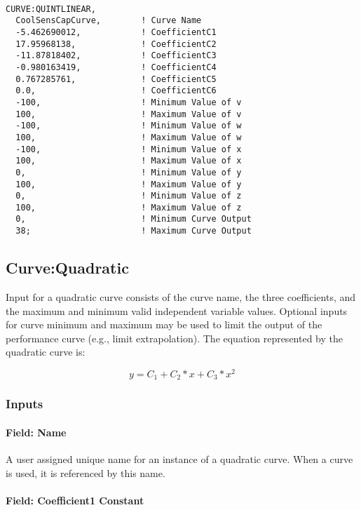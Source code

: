 \begin{lstlisting}

CURVE:QUINTLINEAR,
  CoolSensCapCurve,        ! Curve Name
  -5.462690012,            ! CoefficientC1
  17.95968138,             ! CoefficientC2
  -11.87818402,            ! CoefficientC3
  -0.980163419,            ! CoefficientC4
  0.767285761,             ! CoefficientC5
  0.0,                     ! CoefficientC6
  -100,                    ! Minimum Value of v
  100,                     ! Maximum Value of v
  -100,                    ! Minimum Value of w
  100,                     ! Maximum Value of w
  -100,                    ! Minimum Value of x
  100,                     ! Maximum Value of x
  0,                       ! Minimum Value of y
  100,                     ! Maximum Value of y
  0,                       ! Minimum Value of z
  100,                     ! Maximum Value of z
  0,                       ! Minimum Curve Output
  38;                      ! Maximum Curve Output
\end{lstlisting}

\subsection{Curve:Quadratic}\label{curvequadratic}

Input for a quadratic curve consists of the curve name, the three coefficients, and the maximum and minimum valid independent variable values. Optional inputs for curve minimum and maximum may be used to limit the output of the performance curve (e.g., limit extrapolation). The equation represented by the quadratic curve is:

\begin{equation}
y = {C_1} + {C_2}*x + {C_3}*{x^2}
\end{equation}

\subsubsection{Inputs}\label{inputs-2-026}

\paragraph{Field: Name}\label{field-name-2-025}

A user assigned unique name for an instance of a quadratic curve. When a curve is used, it is referenced by this name.

\paragraph{Field: Coefficient1 Constant}\label{field-coefficient1-constant-2}

